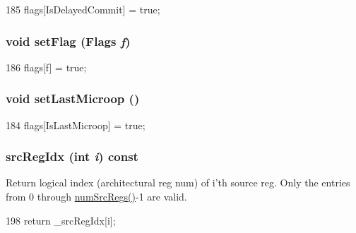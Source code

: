 \begin{DoxyCode}
185 { flags[IsDelayedCommit] = true; }
\end{DoxyCode}
\hypertarget{classStaticInst_a5e243c09e123ab8dacf60d9bf8b12283}{
\subsubsection[{setFlag}]{\setlength{\rightskip}{0pt plus 5cm}void setFlag ({\bf Flags} {\em f})}}
\label{classStaticInst_a5e243c09e123ab8dacf60d9bf8b12283}



\begin{DoxyCode}
186 { flags[f] = true; }
\end{DoxyCode}
\hypertarget{classStaticInst_a1329ca2535b328d75f1cbedb80ec1e0e}{
\subsubsection[{setLastMicroop}]{\setlength{\rightskip}{0pt plus 5cm}void setLastMicroop ()}}
\label{classStaticInst_a1329ca2535b328d75f1cbedb80ec1e0e}



\begin{DoxyCode}
184 { flags[IsLastMicroop] = true; }
\end{DoxyCode}
\hypertarget{classStaticInst_a9353aea3dfe673b88a4a96163d58759f}{
\subsubsection[{srcRegIdx}]{ srcRegIdx (int {\em i}) const}}
\label{classStaticInst_a9353aea3dfe673b88a4a96163d58759f}
Return logical index (architectural reg num) of i'th source reg. Only the entries from 0 through \hyperlink{classStaticInst_a3902ecc708a6f28e94ee9aa975692915}{numSrcRegs()}-\/1 are valid. 


\begin{DoxyCode}
198 { return _srcRegIdx[i]; }
\end{DoxyCode}


